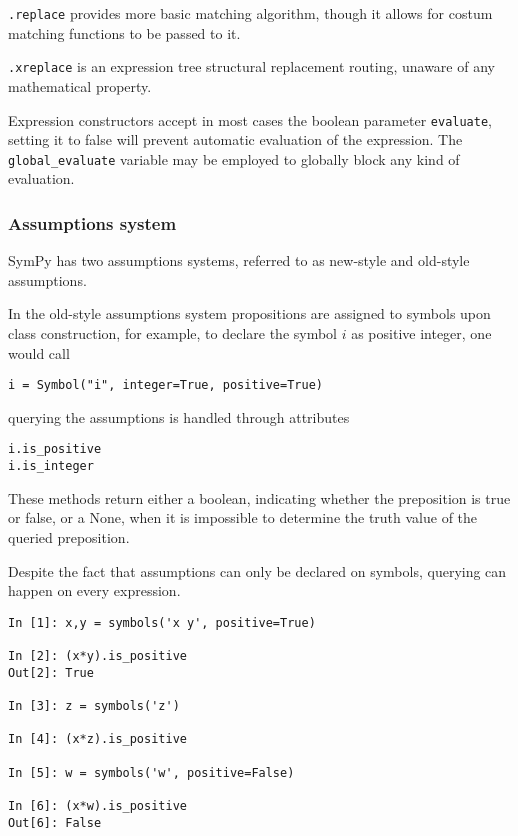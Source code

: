 \texttt{.replace} provides more basic matching algorithm,
though it allows for costum matching functions to be passed to it.

\texttt{.xreplace} is an expression tree structural replacement routing,
unaware of any mathematical property.



Expression constructors accept in most cases the boolean parameter \texttt{evaluate},
setting it to false will prevent automatic evaluation of the expression.
The \verb|global_evaluate| variable may be employed to globally block any kind
of evaluation.


\subsubsection{Assumptions system}



SymPy has two assumptions systems, referred to as new-style and old-style assumptions.

In the old-style assumptions system propositions are assigned to symbols
upon class construction, for example, to declare the symbol $i$ as positive integer,
one would call

\begin{verbatim}
i = Symbol("i", integer=True, positive=True)
\end{verbatim}

querying the assumptions is handled through attributes

\begin{verbatim}
i.is_positive
i.is_integer
\end{verbatim}

These methods return either a boolean, indicating whether the preposition is true or false,
or a None, when it is impossible to determine the truth value of the queried preposition.

Despite the fact that assumptions can only be declared on symbols, querying can
happen on every expression.

\begin{verbatim}
In [1]: x,y = symbols('x y', positive=True)

In [2]: (x*y).is_positive
Out[2]: True

In [3]: z = symbols('z')

In [4]: (x*z).is_positive

In [5]: w = symbols('w', positive=False)

In [6]: (x*w).is_positive
Out[6]: False
\end{verbatim}

